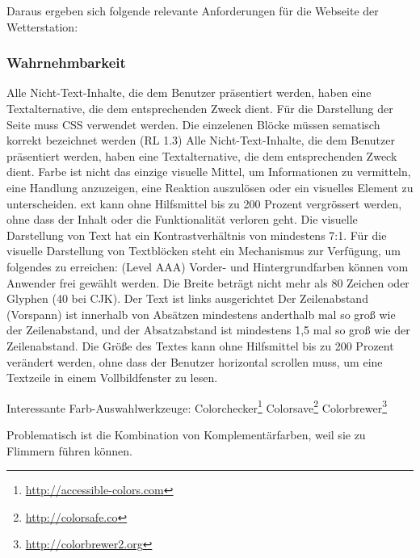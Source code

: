 Daraus ergeben sich folgende relevante Anforderungen für die Webseite der Wetterstation:


\subsubsection*{Wahrnehmbarkeit}
Alle Nicht-Text-Inhalte, die dem Benutzer präsentiert werden, haben eine Textalternative, die dem entsprechenden Zweck dient.
Für die Darstellung der Seite muss CSS verwendet werden. Die einzelenen Blöcke müssen sematisch korrekt bezeichnet werden (RL 1.3)
Alle Nicht-Text-Inhalte, die dem Benutzer präsentiert werden, haben eine Textalternative, die dem entsprechenden Zweck dient.
Farbe ist nicht das einzige visuelle Mittel, um Informationen zu vermitteln, eine Handlung anzuzeigen, eine Reaktion auszulösen oder ein visuelles Element zu unterscheiden. ext kann ohne Hilfsmittel bis zu 200 Prozent vergrössert werden, ohne dass der Inhalt oder die Funktionalität verloren geht. Die visuelle Darstellung von Text hat ein Kontrastverhältnis von mindestens 7:1.
Für die visuelle Darstellung von Textblöcken steht ein Mechanismus zur Verfügung, um folgendes zu erreichen: (Level AAA)
Vorder- und Hintergrundfarben können vom Anwender frei gewählt werden.
Die Breite beträgt nicht mehr als 80 Zeichen oder Glyphen (40 bei CJK).
Der Text ist links ausgerichtet
Der Zeilenabstand (Vorspann) ist innerhalb von Absätzen mindestens anderthalb mal so groß wie der Zeilenabstand, und der Absatzabstand ist mindestens 1,5 mal so groß wie der Zeilenabstand.
Die Größe des Textes kann ohne Hilfsmittel bis zu 200 Prozent verändert werden, ohne dass der Benutzer horizontal scrollen muss, um eine Textzeile in einem Vollbildfenster zu lesen.

Interessante Farb-Auswahlwerkzeuge:
Colorchecker\footnote{ \url{http://accessible-colors.com}}
Colorsave\footnote{ \url{http://colorsafe.co}}
Colorbrewer\footnote{ \url{http://colorbrewer2.org}}


Problematisch ist die Kombination von Komplementärfarben, weil sie zu Flimmern führen können.~\cite{HellbuschJanEric2011Bvuu}

